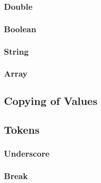 \subsubsection{Double}
\label{type:Double}
\subsubsection{Boolean}
\label{type:Boolean}
\subsubsection{String}
\label{type:String}
\subsubsection{Array}
\label{type:Array}

\subsection{Copying of Values}
\label{copying}

\subsection{Tokens}
\label{tokens}

\subsubsection{Underscore}
\label{token:_}
\subsubsection{Break}
\label{token:break}